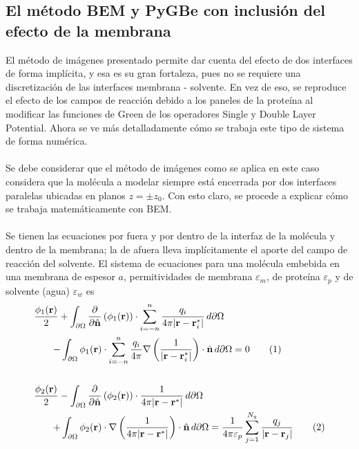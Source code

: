 \documentclass[12pt, oneside, numbers, spanish]{ezthesis}
\newcommand\numberthis{\addtocounter{equation}{1}\tag{\theequation}}
\numberwithin{equation}{section}
\begin{document}
\subsection{El método BEM y PyGBe con inclusión del efecto de la membrana} \label{subsec:BEM_PyGBE}
El método de imágenes presentado permite dar cuenta del efecto de dos interfaces de forma implícita, y esa es su gran fortaleza, pues no se requiere una discretización de las interfaces membrana - solvente. En vez de eso, se reproduce el efecto de los campos de reacción debido a los paneles de la proteína al modificar las funciones de Green de los operadores Single y Double Layer Potential. Ahora se ve más detalladamente cómo se trabaja este tipo de sistema de forma numérica.\\\\
Se debe considerar que el método de imágenes como se aplica en este caso considera que la molécula a modelar siempre está encerrada por dos interfaces paralelas ubicadas en planos $z = \pm z_0$. Con esto claro, se procede a explicar cómo se trabaja matemáticamente con BEM.\\\\
Se tienen las ecuaciones por fuera y por dentro de la interfaz de la molécula y dentro de la membrana; la de afuera lleva implícitamente el aporte del campo de reacción del solvente. El sistema de ecuaciones para una molécula embebida en una membrana de espesor $a$, permitividades de membrana $\varepsilon_m$, de proteína $\varepsilon_p$ y de solvente (agua) $\varepsilon_w$ es
\begin{align*}
\frac{\phi_1(\mathbf{r})}{2} + \int_{\partial\Omega}\frac{\partial}{\partial\hat{\mathbf{n}}}&\left(\phi_1(\mathbf{r})\right)\cdot\sum_{i=-n}^{n}\frac{q_i}{4\pi|\mathbf{r} - \mathbf{r}_i^*|}\, d\partial\Omega \\
 - \int_{\partial\Omega}\phi_1(\mathbf{r})&\cdot\sum_{i = -n}^{n}\frac{q_i}{4\pi}\nabla\left(\frac{1}{|\mathbf{r} - \mathbf{r}_i^*|}\right)\cdot\hat{\mathbf{n}}\, d\partial\Omega = 0\numberthis \label{eqn:membrane1} \\\\
\frac{\phi_2(\mathbf{r})}{2} - \int_{\partial\Omega}\frac{\partial}{\partial\hat{\mathbf{n}}}&\left(\phi_2(\mathbf{r})\right)\cdot\frac{1}{4\pi|\mathbf{r} - \mathbf{r}^*|}\, d\partial\Omega\\
+ \int_{\partial\Omega}\phi_2(\mathbf{r})&\cdot\nabla\left(\frac{1}{4\pi|\mathbf{r} - \mathbf{r}^*|}\right)\cdot\hat{\mathbf{n}}\, d\partial\Omega = \frac{1}{4\pi\varepsilon_p}\sum_{j = 1}^{N_q}\frac{q_j}{|\mathbf{r} - \mathbf{r}_j|} \numberthis \label{eqn:membrane2}
\end{align*}
\end{document}
